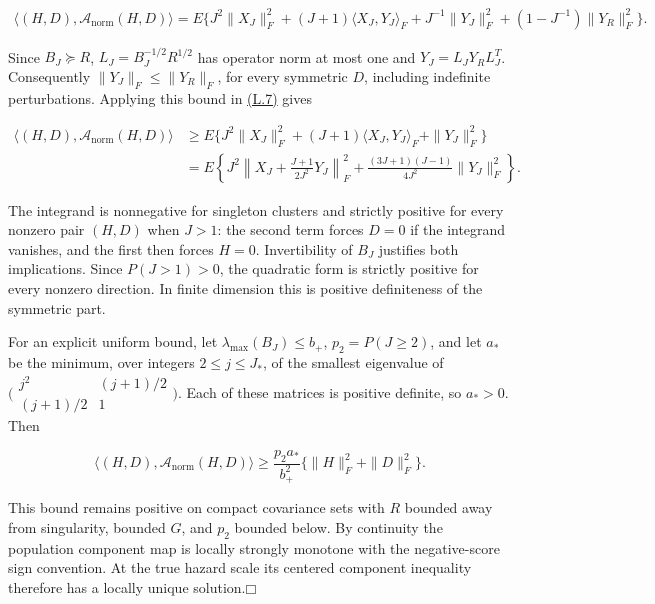 \documentclass[11pt]{article}
\providecommand{\square}{\mdlgwhtsquare}
\begin{document}
\begin{equation*}
\begin{aligned}
\langle(H,D),\mathcal A_{\mathrm{norm}}(H,D)\rangle
 =E\big\{J^2\|X_J\|_F^2+(J+1)\langle X_J,Y_J\rangle_F
 +J^{-1}\|Y_J\|_F^2+(1-J^{-1})\|Y_R\|_F^2\big\}.
\end{aligned}\tag{L.7}\label{eq:L.7}
\end{equation*}

Since \(B_J\succeq R\), \(L_J=B_J^{-1/2}R^{1/2}\) has operator norm at most one and \(Y_J=L_JY_RL_J^T\). Consequently \(\|Y_J\|_F\leq\|Y_R\|_F\), for every symmetric \(D\), including indefinite perturbations. Applying this bound in \hyperref[eq:L.7]{(L.7)} gives

\begin{equation*}
\begin{aligned}
\langle(H,D),\mathcal A_{\mathrm{norm}}(H,D)\rangle
&\geq E\{J^2\|X_J\|_F^2+(J+1)\langle X_J,Y_J\rangle_F+\|Y_J\|_F^2\}\\
&=E\left\{J^2\left\|X_J+\frac{J+1}{2J^2}Y_J\right\|_F^2
 +\frac{(3J+1)(J-1)}{4J^2}\|Y_J\|_F^2\right\}.
\end{aligned}\tag{L.8}\label{eq:L.8}
\end{equation*}

The integrand is nonnegative for singleton clusters and strictly positive for every nonzero pair \((H,D)\) when \(J>1\): the second term forces \(D=0\) if the integrand vanishes, and the first then forces \(H=0\). Invertibility of \(B_J\) justifies both implications. Since \(P(J>1)>0\), the quadratic form is strictly positive for every nonzero direction. In finite dimension this is positive definiteness of the symmetric part.

For an explicit uniform bound, let \(\lambda_{\max}(B_J)\leq b_+\), \(p_2=P(J\geq2)\), and let \(a_*\) be the minimum, over integers \(2\leq j\leq J_*\), of the smallest eigenvalue of \(\bigl(\begin{smallmatrix}j^2&(j+1)/2\\(j+1)/2&1\end{smallmatrix}\bigr)\). Each of these matrices is positive definite, so \(a_*>0\). Then

\begin{equation*}
\langle(H,D),\mathcal A_{\mathrm{norm}}(H,D)\rangle
 \geq \frac{p_2a_*}{b_+^2}\{\|H\|_F^2+\|D\|_F^2\}.\tag{L.9}\label{eq:L.9}
\end{equation*}

This bound remains positive on compact covariance sets with \(R\) bounded away from singularity, bounded \(G\), and \(p_2\) bounded below. By continuity the population component map is locally strongly monotone with the negative-score sign convention. At the true hazard scale its centered component inequality therefore has a locally unique solution.\hfill$\square$
\end{document}
